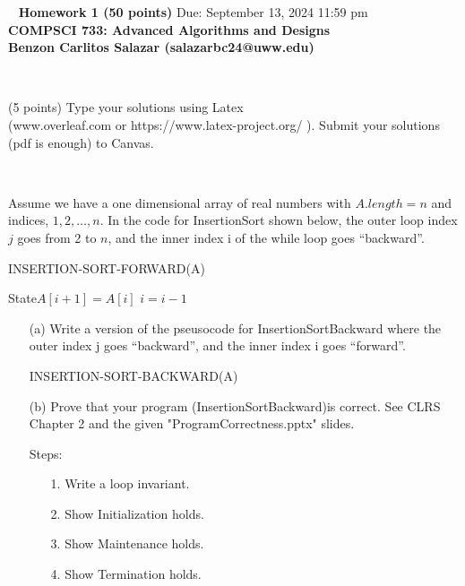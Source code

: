 \documentclass[12pt]{article}
\newcommand{\vs}{\vspace{2mm}}
\newcommand{\ls}{\vspace{5mm}}
\newcommand{\bc}{\begin{center}}
\newcommand{\ec}{\end{center}}
\begin{document}
\bc\ 
 { \bf  Homework  1 (50 points)}  Due: September 13, 2024 11:59 pm\\
 { \bf COMPSCI 733: Advanced Algorithms and Designs } \\ 
 { \bf Benzon Carlitos Salazar (salazarbc24@uww.edu) } 
\ec\  
\ls\

 (5 points)
Type your solutions using Latex \\
(www.overleaf.com or https://www.latex-project.org/ ). Submit your solutions (pdf is enough)  to Canvas. 




\vs\

Assume we have a one dimensional array of real numbers with $A.length = n$ and indices, $1, 2, \ldots, n$.
In the code for InsertionSort  shown below, the outer loop index $j$ goes from 2 to $n$, and the inner index i of the while loop goes “backward”. 

\begin{algorithm}
\caption{INSERTION-SORT-FORWARD(A)}
\begin{algorithmic}[1]
\State{$i=j-1$}
\While{$i > 0$ and $A[i] > key$} 
  State{$A[i+1]=A[i]$} 
    \State $i = i-1$
\EndWhile
{}
\EndFor
\end{algorithmic}
\end{algorithm}

\begin{itemize}
 \item[(a)] Write a version of the pseusocode for InsertionSortBackward where the outer index j goes “backward”, and the inner index i goes “forward”.  

\begin{algorithm}
\caption{INSERTION-SORT-BACKWARD(A)}
\begin{algorithmic}[1]
    \State{$i = j + 1$}
    \While{$i \leq n$ and $A[i] < key$}
        \State{$i = i + 1$}
    \EndWhile
\EndFor
\end{algorithmic}
\end{algorithm}

\item[(b)] Prove that your program (InsertionSortBackward)is correct.
See CLRS Chapter 2 and the given "ProgramCorrectness.pptx" slides.

Steps:
\begin{itemize}
\item[1.]	 Write a loop invariant.
\item[2.]	Show Initialization holds.
\item[3.]Show Maintenance  holds.
\item[4.]	Show Termination holds.
\end{itemize}
\end{itemize}
\end{document}
